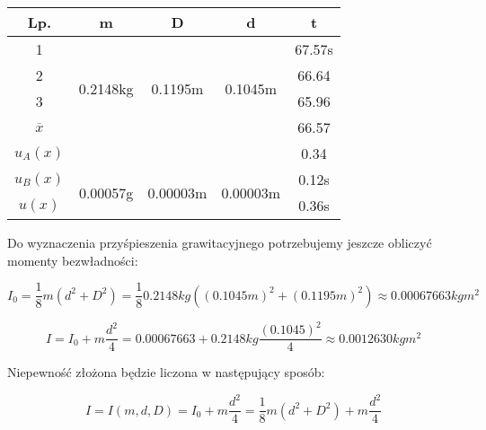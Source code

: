 \begin{center}
    \begin{tabular}{|c|c|c|c|c|}
        \hline
        Lp. & m       & D       & d       & t \\
        \hline
        1 &  \multirow{4}{*}{0.2148kg}  & \multirow{4}{*}{0.1195m} & \multirow{4}{*}{0.1045m} & 67.57s \\
        2 &                           &                          &                          &  66.64 \\
        3 &                           &                          &                          &  65.96 \\
        $\overline{x}$ &              &                          &                          & 66.57  \\
        \hline
        $u_A(x)$  & \multicolumn{3}{|c|}{\cellcolor{black!10}}                                                  & 0.34 \\
        \hline
        $u_B(x)$  & \multirow{2}{*}{0.00057g} & \multirow{2}{*}{0.00003m}  & \multirow{2}{*}{0.00003m} & 0.12s \\
        $u(x)$    &            &                   &                  &
        0.36s \\
        \hline
        
    \end{tabular}
\end{center}

Do wyznaczenia przyśpieszenia grawitacyjnego potrzebujemy jeszcze obliczyć momenty bezwładności: 

$$I_0 = \frac{1}{8} m(d^2 + D^2) = \frac{1}{8} 0.2148kg((0.1045m)^2 + (0.1195m)^2) \approx 0.00067663 kgm^2$$

$$I = I_0 + m \frac{d^2}{4} = 0.00067663 + 0.2148kg \frac{(0.1045)^2}{4} \approx 0.0012630kgm^2	$$

Niepewność złożona będzie liczona w następujący sposób:

$$I = I(m, d, D) = I_0 + m \frac{d^2}{4} = \frac{1}{8} m(d^2 + D^2) + m \frac{d^2}{4}$$

